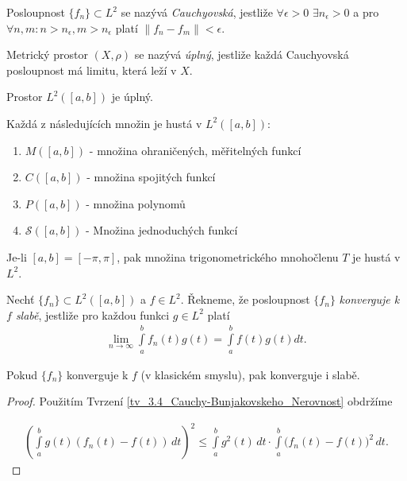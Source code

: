 \begin{definition}\label{d_3.10_Cauchyovska_Posloupnost}
Posloupnost $\{f_n\} \subset L^2$ se nazývá \textit{Cauchyovská}, jestliže $\forall \epsilon > 0$ $\exists n_{\epsilon} > 0$ a pro $\forall n,m : n>n_{\epsilon}, m>n_{\epsilon}$ platí $\|f_n - f_m\| < \epsilon$.
\end{definition}

\begin{definition}
\label{d_3.11_Uplny_Metricky_Prostor}
Metrický prostor $(X,\rho)$ se nazývá \textit{úplný}, jestliže každá Cauchyovská posloupnost má limitu, která leží v $X$.
\end{definition}

\begin{theorem}\label{v_3.12_Fischer}
Prostor $L^2([a,b])$ je úplný.
\end{theorem}



\begin{theorem}\label{v_3.13}
Každá z následujících množin je hustá v $L^2([a,b])$:
\begin{enumerate}
\item $M([a,b])$ - množina ohraničených, měřitelných funkcí
\item $C([a,b])$ - množina spojitých funkcí
\item $P([a,b])$ - množina polynom\r u
\item $\mathcal{S}([a,b])$ - Množina jednoduchých funkcí
\end{enumerate}
Je-li $[a,b] = [-\pi, \pi]$, pak množina trigonometrického mnohočlenu $T$ je hustá v $L^2$.
\end{theorem}

\begin{definition}\label{d_3.14_Slaba_Konvergence}
Nechť $\{f_n\} \subset L^2([a,b])$ a $f \in L^2$. Řekneme, že posloupnost $\{f_n\}$ \textit{konverguje k $f$ slabě}, jestliže pro každou funkci $g \in L^2$ platí
\begin{align*}
\lim_{n \rightarrow \infty} \int \limits_a^b f_n(t) g(t) = \int \limits_a^b f(t) g(t) dt. 
\end{align*}
\end{definition}

\begin{theorem}\label{v_3.14}
Pokud $\{f_n\}$ konverguje k $f$ (v klasickém smyslu), pak konverguje i slabě.
\end{theorem}
\begin{proof}
Použitím Tvrzení \ref{tv_3.4_Cauchy-Bunjakovskeho_Nerovnost} obdržíme

\begin{align*}
\left( \int \limits_a^b g(t) (f_n(t)-f(t)) \, dt \right)^2 \leq \int \limits_a^b g^2(t) \, dt \cdot \int \limits_a^b \Big(f_n(t)-f(t)\Big)^2 \, dt.
\end{align*}
\end{proof}

